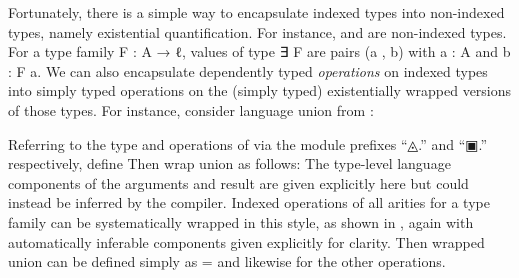 \documentclass[acmsmall,screen,anonymous,timestamp]{acmart}
\begin{document}
Fortunately, there is a simple way to encapsulate indexed types into non-indexed types, namely existential quantification.
For instance, { } and { } are non-indexed types.
For a type family {\AB F \AK : \AB A \AK →  \AB ℓ}, values of type {\AF ∃ \AB F} are pairs {(\AB a , \AB b)} with {\AB a \AK : \AB A} and {\AB b \AK : \AB F \AB a}.
We can also encapsulate dependently typed \emph{operations} on indexed types into simply typed operations on the (simply typed) existentially wrapped versions of those types.
For instance, consider language union from :
\begin{code}
\>[2]%
\>[7]\AgdaSymbol{:}\AgdaSpace{}%
%
\>[15]%
\>[18]\AgdaSpace{}%
\AgdaSpace{}%
%
\>[28]\AgdaSpace{}%
\AgdaSpace{}%
\AgdaSymbol{(}%
\>[39]%
\>[44]\AgdaSymbol{)}\<%
\end{code}
Referring to the type and operations of  via the module prefixes ``{◬.}\hspace{0.05em}'' and ``{▣.}\hspace{0.05em}'' respectively, define 
Then wrap union as follows:
The type-level language components of the arguments and result are given explicitly here but could instead be inferred by the compiler.
\rnc{}
Indexed operations of all arities for a type family  can be systematically wrapped in this style, as shown in
, again with automatically inferable components given explicitly for clarity.
Then wrapped union can be defined simply as { \AS =  } and likewise for the other operations.
\end{document}
